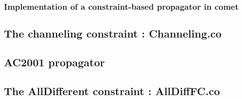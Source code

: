 \documentclass{eplDoc}
\begin{document}
\subsubsection{Implementation of a constraint-based propagator in comet}
\subsection{The channeling constraint : Channeling.co} %

\subsection{AC2001 propagator} %

\subsection{The AllDifferent constraint : AllDiffFC.co} %
\end{document}
